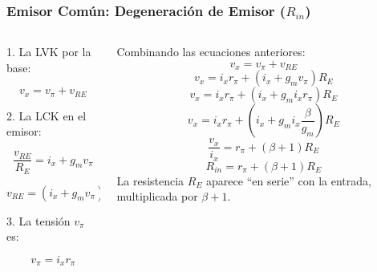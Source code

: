 \begin{frame}[t]
    \frametitle{Emisor Común: Degeneración de Emisor ($R_{in}$)}

    \begin{columns}
        \begin{column}{0.5\textwidth}
            1. La LVK por la base:
    
            \[ v_x = v_\pi + v_{RE} \]

            \vspace{5mm}
            2. La LCK en el emisor:

            \[ \dfrac{v_{RE}}{R_E} = i_x + g_m v_\pi \]

            \[ v_{RE} = (i_x + g_m v_\pi) R_E \]

            \vspace{5mm}
            3. La tensión $v_\pi$ es:

            \[ v_\pi = i_x r_\pi \]
        \end{column}
        \begin{column}{0.5\textwidth}
            Combinando las ecuaciones anteriores:
            \[ v_x = v_\pi + v_{RE} \]
            \[ v_x = i_x r_\pi + (i_x + g_m v_\pi) R_E \]
            \[ v_x = i_x r_\pi + (i_x + g_m i_x r_\pi) R_E \]
            \[ v_x = i_x r_\pi + (i_x + g_m i_x \dfrac{\beta}{g_m}) R_E \]
            \[ \dfrac{v_x}{i_x} = r_\pi + (\beta + 1) R_E \]
            \[ \boxed{R_{in} = r_\pi + (\beta + 1) R_E} \]
            La resistencia $R_E$ aparece ``en serie'' con la entrada, multiplicada por $\beta+1$.
        \end{column}            
    \end{columns}
\end{frame}


